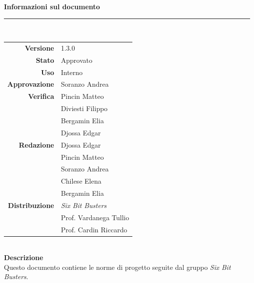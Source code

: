 \begin{titlepage}
\begin{center}
	\large \textbf{Informazioni sul documento} \\
	\rule{0.6\textwidth}{0.4pt}
	\\[0.5cm]
	\begin{tabular}{r|l}
		\textbf{Versione} & 1.3.0\\
		\textbf{Stato} & Approvato\\
		\textbf{Uso} & Interno\\                         
		\textbf{Approvazione} & Soranzo Andrea\\                      
		\textbf{Verifica} & Pincin Matteo\\ & Diviesti Filippo\\ & Bergamin Elia\\ & Djossa Edgar\\                        
		\textbf{Redazione} & Djossa Edgar \\ & Pincin Matteo \\ & Soranzo Andrea\\ & Chilese Elena \\ & Bergamin Elia\\
		\textbf{Distribuzione} & \textit{Six Bit Busters} \\ & Prof. Vardanega Tullio \\ & Prof. Cardin Riccardo
	\end{tabular}	
	\\[0.8cm]

	\large \textbf{Descrizione} \\
	Questo documento contiene le norme di progetto seguite dal gruppo \textit{Six Bit Busters}.
	
	
	
	\end{center}
\end{titlepage}

